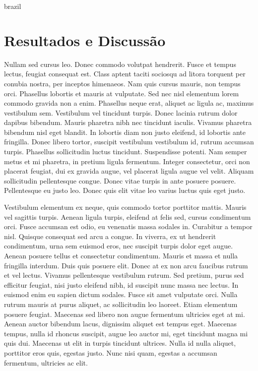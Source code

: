 \begin{otherlanguage*}{brazil}
        \section*{Resultados e Discussão}
        Nullam sed cursus leo. Donec commodo volutpat hendrerit. Fusce et tempus lectus, feugiat
        consequat est. Class aptent taciti sociosqu ad litora torquent per conubia nostra, per
        inceptos himenaeos. Nam quis cursus mauris, non tempus orci. Phasellus lobortis et mauris at
        vulputate. Sed nec nisl elementum lorem commodo gravida non a enim. Phasellus neque erat,
        aliquet ac ligula ac, maximus vestibulum sem. Vestibulum vel tincidunt turpis. Donec lacinia
        rutrum dolor dapibus bibendum. Mauris pharetra nibh nec tincidunt iaculis. Vivamus pharetra
        bibendum nisl eget blandit. In lobortis diam non justo eleifend, id lobortis ante fringilla.
        Donec libero tortor, suscipit vestibulum vestibulum id, rutrum accumsan turpis. Phasellus
        sollicitudin luctus tincidunt. Suspendisse potenti. Nam semper metus et mi pharetra, in
        pretium ligula fermentum. Integer consectetur, orci non placerat feugiat, dui ex gravida
        augue, vel placerat ligula augue vel velit. Aliquam sollicitudin pellentesque congue. Donec
        vitae turpis in ante posuere posuere. Pellentesque eu justo leo. Donec quis elit vitae leo
        varius luctus quis eget justo.

        Vestibulum elementum ex neque, quis commodo tortor porttitor
        mattis. Mauris vel sagittis turpis. Aenean ligula turpis, eleifend at felis sed, cursus
        condimentum orci. Fusce accumsan est odio, eu venenatis massa sodales in. Curabitur a tempor
        nisl. Quisque consequat sed arcu a congue. In viverra, ex ut hendrerit condimentum, urna sem
        euismod eros, nec suscipit turpis dolor eget augue. Aenean posuere tellus et consectetur
        condimentum. Mauris et massa et nulla fringilla interdum. Duis quis posuere elit. Donec at
        ex non arcu faucibus rutrum et vel lectus. Vivamus pellentesque vestibulum rutrum. Sed
        pretium, purus sed efficitur feugiat, nisi justo eleifend nibh, id suscipit nunc massa nec
        lectus. In euismod enim eu sapien dictum sodales. Fusce sit amet vulputate orci. Nulla
        rutrum mauris at purus aliquet, ac sollicitudin leo laoreet. Etiam elementum posuere
        feugiat. Maecenas sed libero non augue fermentum ultricies eget at mi. Aenean auctor
        bibendum lacus, dignissim aliquet est tempus eget. Maecenas tempus, nulla id rhoncus
        suscipit, augue leo auctor mi, eget tincidunt magna mi quis dui. Maecenas ut elit in turpis
        tincidunt ultrices. Nulla id nulla aliquet, porttitor eros quis, egestas justo. Nunc nisi
        quam, egestas a accumsan fermentum, ultricies ac elit.


\end{otherlanguage*}
